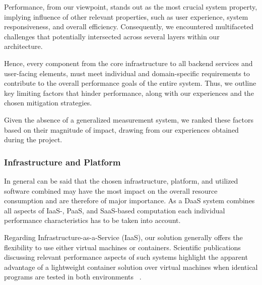 \documentclass[runningheads]{llncs}
\begin{document}
Performance, from our viewpoint, stands out as the most crucial system property,
implying influence of other  relevant properties,
such as user experience, system responsiveness, and overall efficiency.
Consequently, we encountered multifaceted challenges
that potentially intersected across several layers within our architecture.

Hence, every component from the core infrastructure
to all backend services and user-facing elements,
must meet individual and domain-specific requirements
to contribute to the overall performance goals of the entire system.
Thus, we outline key limiting factors that hinder performance,
along with our experiences and the chosen mitigation strategies.

Given the absence of a generalized measurement system,
we ranked these factors based on their magnitude of impact,
drawing from our experiences obtained during the project.


\subsubsection{Infrastructure and Platform}
In general can be said that the chosen infrastructure, platform,
and utilized software combined may have the most impact on the overall resource consumption
and are therefore of major importance.
As a DaaS system combines all aspects of IaaS-, PaaS, and SaaS-based computation
each individual performance characteristics has to be taken into account.


Regarding Infrastructure-as-a-Service (IaaS),
our solution generally offers the flexibility
to use either virtual machines or containers.
Scientific publications discussing relevant performance aspects of such systems
highlight the apparent advantage of a lightweight container solution
over virtual machines when identical programs are tested in both environments
~\cite{felter2015updated,potdar2020performance,seo2014performance}.
\end{document}
